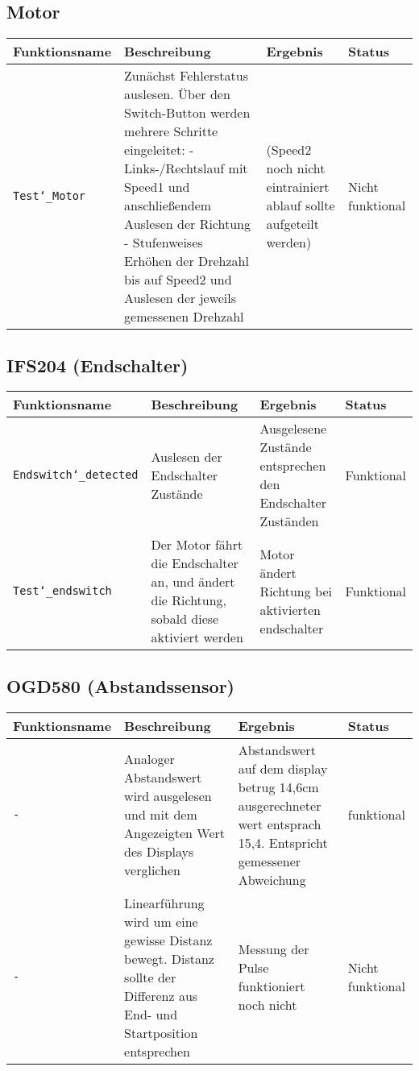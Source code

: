 \documentclass{article}
\begin{document}
	\subsection{Motor}
		\begin{tabular}{|p{3.2cm}|p{5.5cm}|p{4cm}| p{1.6cm} |}
			\hline
				\textbf{Funktionsname} & \textbf{Beschreibung} & \textbf{Ergebnis} & \textbf{Status} \\
			\hline
				\texttt{Test\char`_Motor} & Zunächst Fehlerstatus auslesen. Über den Switch-Button werden mehrere Schritte eingeleitet:
				- Links-/Rechtslauf mit Speed1 und anschließendem Auslesen der Richtung 
				- Stufenweises Erhöhen der Drehzahl bis auf Speed2 und Auslesen der jeweils gemessenen Drehzahl & (Speed2 noch nicht eintrainiert ablauf sollte aufgeteilt werden) & Nicht funktional \\
			\hline
		\end{tabular}
	\subsection{IFS204 (Endschalter)}
		\begin{tabular}{|p{3.2cm}|p{5.5cm}|p{4cm}| p{1.6cm} |}
			\hline
				\textbf{Funktionsname} & \textbf{Beschreibung} & \textbf{Ergebnis} & \textbf{Status} \\
			\hline
				 \texttt{Endswitch\char`_detected} & Auslesen der Endschalter Zustände & Ausgelesene Zustände entsprechen den Endschalter Zuständen & Funktional \\
			\hline
				\texttt{Test\char`_endswitch} & Der Motor fährt die Endschalter an, und ändert die Richtung, sobald diese aktiviert werden & Motor ändert Richtung bei aktivierten endschalter & Funktional \\
			 \hline
		\end{tabular}
	\subsection{OGD580 (Abstandssensor)}
		\begin{tabular}{|p{3.2cm}|p{5.5cm}|p{4cm}| p{1.6cm} |}
			\hline
				\textbf{Funktionsname} & \textbf{Beschreibung} & \textbf{Ergebnis} & \textbf{Status} \\
			\hline
				\texttt{-} & Analoger Abstandswert wird ausgelesen und mit dem Angezeigten Wert des Displays verglichen & Abstandswert auf dem display betrug 14,6cm ausgerechneter wert entsprach 15,4. Entspricht gemessener Abweichung & funktional \\
			\hline
				\texttt{-} & Linearführung wird um eine gewisse Distanz bewegt. Distanz sollte der Differenz aus End- und Startposition entsprechen & Messung der Pulse funktioniert noch nicht & Nicht funktional \\
			\hline
		\end{tabular}
\end{document}
